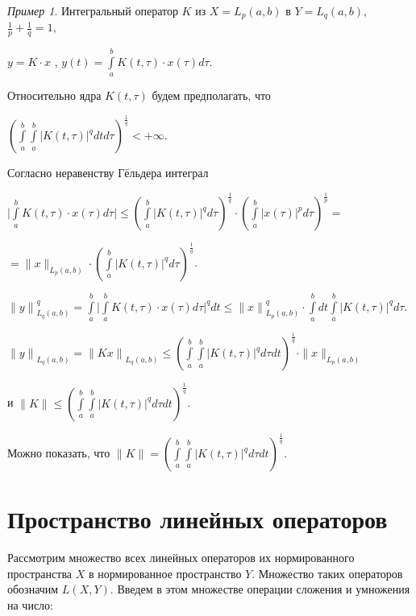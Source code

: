 \documentclass[12pt,a4paper,titlepage,oneside]{book}
\theoremstyle{definition}
\theoremstyle{plain}
\theoremstyle{remark}
\theoremstyle{remark}
\newtheorem*{example}{Пример}
\theoremstyle{remark}
\theoremstyle{remark}
\theoremstyle{plain}
\theoremstyle{plain}
\begin{document}
\begin{example}
Интегральный оператор $K$ из $X=L_p(a,b)$ в $Y=L_q(a,b)$, $
\frac{1}{p}+\frac{1}{q}=1$,
\begin{center}
$y=K\cdot x$ , $ y(t)=\displaystyle\int\limits_a^b K(t,\tau)\cdot x(\tau)d\tau$.
\end{center}

Относительно ядра $K(t,\tau)$ будем предполагать, что 
\begin{center}
${(\displaystyle\int\limits_a^b \displaystyle\int\limits_a^b {\vert K(t,\tau)\vert} ^q dtd\tau)^\frac{1}{q}} <+\infty$.
\end{center}

Согласно неравенству Гёльдера интеграл 
\begin{center}
$\vert \displaystyle\int\limits_a^b K(t,\tau)\cdot x(\tau)d\tau \vert \leq (\displaystyle\int\limits_a^b {\vert K(t,\tau)\vert} ^q d\tau)^\frac{1}{q} \cdot {(\displaystyle\int\limits_a^b {\vert x(\tau)\vert} ^p d\tau)^\frac{1}{p}=}$

$= \parallel x \parallel _{L_p(a,b)}\cdot (\displaystyle\int\limits_a^b {\vert K(t,\tau)\vert} ^q d\tau)^\frac{1}{q}$.

${\parallel y \parallel}^q _{L_q(a,b)}=\displaystyle\int\limits_a^b {\vert \displaystyle\int\limits_a^b K(t,\tau)\cdot x(\tau)d\tau \vert^{q}} dt\leq {\parallel x \parallel}^q _{L_p(a,b)} \cdot \displaystyle\int\limits_a^b dt \displaystyle\int\limits_a^b {\vert K(t,\tau)\vert} ^q d\tau$.

${\parallel y \parallel}_{L_q(a,b)}=
{\parallel Kx\parallel}_{L_q(a,b)} \leq {(\displaystyle\int\limits_a^b \displaystyle\int\limits_a^b {\vert K(t,\tau)\vert} ^q d\tau dt)^\frac{1}{q}}\cdot \parallel x \parallel _{L_p(a,b)} $ 
\end{center}
и $\parallel K \parallel \leq {(\displaystyle\int\limits_a^b \displaystyle\int\limits_a^b {\vert K(t,\tau)\vert} ^q d\tau dt)^\frac{1}{q}}$.

Можно показать, что $\parallel K \parallel = 
{(\displaystyle\int\limits_a^b \displaystyle\int\limits_a^b {\vert K(t,\tau)\vert} ^q d\tau dt)^\frac{1}{q}}.$
\end{example}

\section{Пространство линейных операторов}
Рассмотрим множество всех линейных операторов их нормированного пространства $X$ в нормированное пространство $Y$. Множество таких операторов обозначим $L(X,Y)$. Введем в этом множестве операции сложения и умножения на число:
\end{document}
